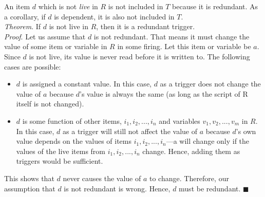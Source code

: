 \documentclass{sig-alternate-05-2015}
\begin{document}
\begin{enumerate}
An item $d$ which is not \textit{live} in $R$ is not included in $T$ because it is redundant. As a corollary, if $d$ is dependent, it is also not included in $T$.\\
\emph{Theorem}. If $d$ is not live in $R$, then it is a redundant trigger.\\
\emph{Proof}. Let us assume that $d$ is not redundant. That means it must change the value of some item or variable in $R$ in some firing. Let this item or variable be $a$. Since $d$ is not live, its value is never read before it is written to. The following cases are possible:
\begin{itemize} [topsep=-2pt, itemsep=-1pt]
\item $d$ is assigned a constant value. In this case, $d$ as a trigger does not change the value of $a$ because $d$'s value is always the same (as long as the script of R  itself is not changed).
\item $d$ is some function of other items, $i_1, i_2, ..., i_n$ and variables $v_1, v_2, ..., v_m$ in $R$. In this case, $d$ as a trigger will still not affect the value of $a$ because $d$'s own value depends on the values of items $i_1, i_2, ..., i_n$---a will change only if the values of the live items from $i_1, i_2, ..., i_n$ change. Hence, adding them as triggers would be sufficient.
\end{itemize}
This shows that $d$ never causes the value of $a$ to change. Therefore, our assumption that $d$ is not redundant is wrong. Hence, $d$ must be redundant. $\blacksquare$
\end{enumerate}
\end{document}
